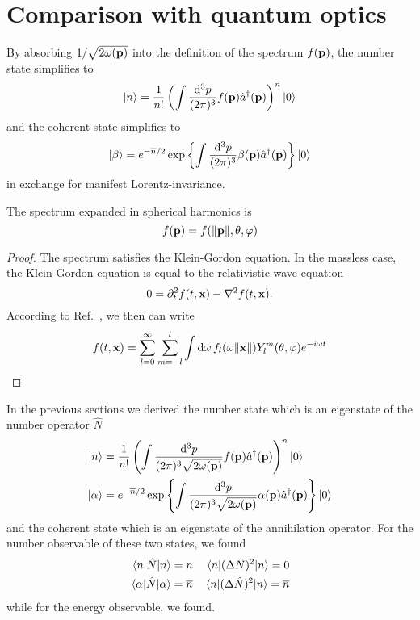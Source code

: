 \section{Comparison with quantum optics}

\begin{lemma}
	By absorbing $1/\sqrt{2\omega(\vb{p})}$ into the definition of the spectrum $f(\vb{p})$, the number state simplifies to
	\begin{equation}
		\ket{n}
		=
		\frac{1}{n!}
		\left(
			\int\frac{\dd[3]{p}}{(2\pi)^3}
			f(\vb{p})
			\hat{a}^\dagger(\vb{p})
		\right)^n
		\ket{0}
	\end{equation}
	and the coherent state simplifies to
	\begin{equation}
		\ket{\beta}
		=
		e^{-\overline{n}/2}
		\exp\left\{
			\int\frac{\dd[3]{p}}{(2\pi)^3}
			\beta(\vb{p})
			\hat{a}^\dagger(\vb{p})
		\right\}
		\ket{0}
	\end{equation}
	in exchange for manifest Lorentz-invariance.
\end{lemma}
\begin{theorem}
	The spectrum expanded in spherical harmonics is
	\begin{equation}
		f(\vb{p})
		=
		f(\norm{\vb{p}},\theta,\varphi)
	\end{equation}
\end{theorem}
\begin{proof}
	The spectrum satisfies the Klein-Gordon equation.
	In the massless case, the Klein-Gordon equation is equal to the relativistic wave equation
	\begin{equation}
		0
		=
		\partial_t^2
		f(t,\vb{x})
		-
		\laplacian
		f(t,\vb{x})
		.
	\end{equation}
	According to Ref.~\cite[p.~538]{Jackson2007}, we then can write
	\begin{equation}
		f(t,\vb{x})
		=
		\sum_{l=0}^\infty
		\sum_{m=-l}^l
		\int\dd{\omega}
		f_l(\omega\norm{\vb{x}})
		Y_l^m(\theta,\varphi)
		e^{-i\omega t}
	\end{equation}
\end{proof}

In the previous sections we derived the number state which is an eigenstate of the number operator $\hat{N}$
\begin{align}
	\ket{n}
	&=
	\frac{1}{n!}
	\left(
		\int\frac{\dd[3]{p}}{(2\pi)^3\sqrt{2\omega(\vb{p})}}
		f(\vb{p})
		\hat{a}^\dagger(\vb{p})
	\right)^n
	\ket{0}
	\\
	\ket{\alpha}
	&=
	e^{-\overline{n}/2}
	\exp\left\{
		\int\frac{\dd[3]{p}}{(2\pi)^3\sqrt{2\omega(\vb{p})}}
		\alpha(\vb{p})
		\hat{a}^\dagger(\vb{p})
	\right\}
	\ket{0}
\end{align}
and the coherent state which is an eigenstate of the annihilation operator.
For the number observable of these two states, we found
\begin{align}
	\expval{\hat{N}}{n}
	=
	n
	&&
	\expval{(\Delta\hat{N})^2}{n}
	=
	0
	\\
	\expval{\hat{N}}{\alpha}
	=
	\overline{n}
	&&
	\expval{(\Delta\hat{N})^2}{n}
	=
	\overline{n}
\end{align}
while for the energy observable, we found.

